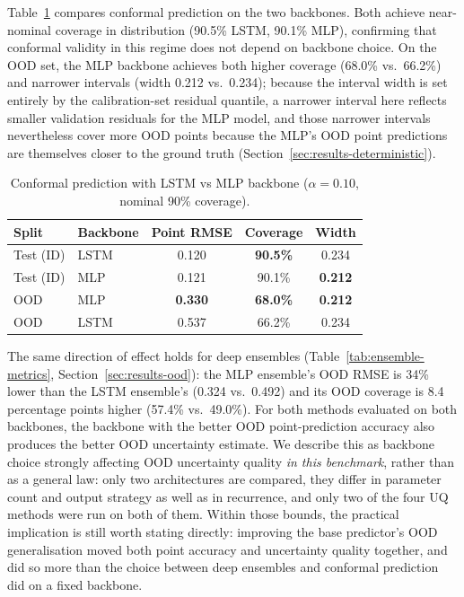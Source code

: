 \documentclass[a4paper,fleqn]{cas-sc}
\begin{document}
Table~\ref{tab:conformal-backbone} compares conformal prediction on the two backbones. Both achieve near-nominal coverage in distribution (90.5\% LSTM, 90.1\% MLP), confirming that conformal validity in this regime does not depend on backbone choice. On the OOD set, the MLP backbone achieves both higher coverage (68.0\% vs.\ 66.2\%) and narrower intervals (width 0.212 vs.\ 0.234); because the interval width is set entirely by the calibration-set residual quantile, a narrower interval here reflects smaller validation residuals for the MLP model, and those narrower intervals nevertheless cover more OOD points because the MLP's OOD point predictions are themselves closer to the ground truth (Section~\ref{sec:results-deterministic}).
\begin{table}[t]
    \centering
    \caption{Conformal prediction with LSTM vs MLP backbone ($\alpha=0.10$, nominal 90\% coverage).}
    \label{tab:conformal-backbone}
    \begin{tabular}{llccc}
        \toprule
        \textbf{Split} & \textbf{Backbone} & \textbf{Point RMSE} & \textbf{Coverage} & \textbf{Width} \\
        \midrule
        Test (ID) & LSTM & 0.120 & \textbf{90.5\%} & 0.234 \\
        Test (ID) & MLP  & 0.121 & 90.1\%          & \textbf{0.212} \\
        \midrule
        OOD & MLP  & \textbf{0.330} & \textbf{68.0\%} & \textbf{0.212} \\
        OOD & LSTM & 0.537          & 66.2\%           & 0.234 \\
        \bottomrule
    \end{tabular}
\end{table}
The same direction of effect holds for deep ensembles (Table~\ref{tab:ensemble-metrics}, Section~\ref{sec:results-ood}): the MLP ensemble's OOD RMSE is 34\% lower than the LSTM ensemble's (0.324 vs.\ 0.492) and its OOD coverage is 8.4 percentage points higher (57.4\% vs.\ 49.0\%). For both methods evaluated on both backbones, the backbone with the better OOD point-prediction accuracy also produces the better OOD uncertainty estimate. We describe this as backbone choice strongly affecting OOD uncertainty quality \emph{in this benchmark}, rather than as a general law: only two architectures are compared, they differ in parameter count and output strategy as well as in recurrence, and only two of the four UQ methods were run on both of them. Within those bounds, the practical implication is still worth stating directly: improving the base predictor's OOD generalisation moved both point accuracy and uncertainty quality together, and did so more than the choice between deep ensembles and conformal prediction did on a fixed backbone.
\end{document}
